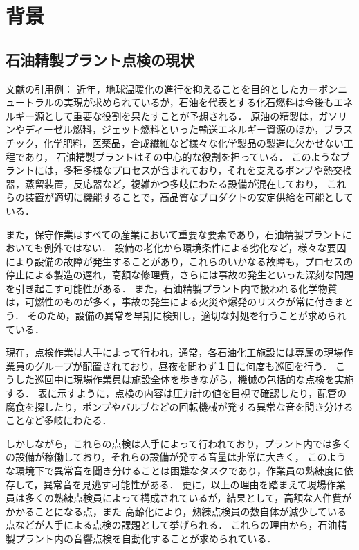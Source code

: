 \documentclass[../main]{subfiles}
\begin{document}

\section{背景}
\subsection{石油精製プラント点検の現状}
\label{sec:intro_background}
文献の引用例：\cite{fujita2023acoustic}
近年，地球温暖化の進行を抑えることを目的としたカーボンニュートラルの実現が求められているが，石油を代表とする化石燃料は今後もエネルギー源として重要な役割を果たすことが予想される．
原油の精製は，ガソリンやディーゼル燃料，ジェット燃料といった輸送エネルギー資源のほか，プラスチック，化学肥料，医薬品，合成繊維など様々な化学製品の製造に欠かせない工程であり，
石油精製プラントはその中心的な役割を担っている．
このようなプラントには，多種多様なプロセスが含まれており，それを支えるポンプや熱交換器，蒸留装置，反応器など，複雑かつ多岐にわたる設備が混在しており，
これらの装置が適切に機能することで，高品質なプロダクトの安定供給を可能としている．

また，保守作業はすべての産業において重要な要素であり，石油精製プラントにおいても例外ではない．
設備の老化から環境条件による劣化など，様々な要因により設備の故障が発生することがあり，これらのいかなる故障も，プロセスの停止による製造の遅れ，高額な修理費，さらには事故の発生といった深刻な問題を引き起こす可能性がある．
また，石油精製プラント内で扱われる化学物質は，可燃性のものが多く，事故の発生による火災や爆発のリスクが常に付きまとう．
そのため，設備の異常を早期に検知し，適切な対処を行うことが求められている．

現在，点検作業は人手によって行われ，通常，各石油化工施設には専属の現場作業員のグループが配置されており，昼夜を問わず１日に何度も巡回を行う．
こうした巡回中に現場作業員は施設全体を歩きながら，機械の包括的な点検を実施する．
表に示すように，点検の内容は圧力計の値を目視で確認したり，配管の腐食を探したり，ポンプやバルブなどの回転機械が発する異常な音を聞き分けることなど多岐にわたる．

しかしながら，これらの点検は人手によって行われており，プラント内では多くの設備が稼働しており，それらの設備が発する音量は非常に大きく，
このような環境下で異常音を聞き分けることは困難なタスクであり，作業員の熟練度に依存して，異常音を見逃す可能性がある．
更に，以上の理由を踏まえて現場作業員は多くの熟練点検員によって構成されているが，結果として，高額な人件費がかかることになる点，また
高齢化により，熟練点検員の数自体が減少している点などが人手による点検の課題として挙げられる．
これらの理由から，石油精製プラント内の音響点検を自動化することが求められている．
\end{document}
